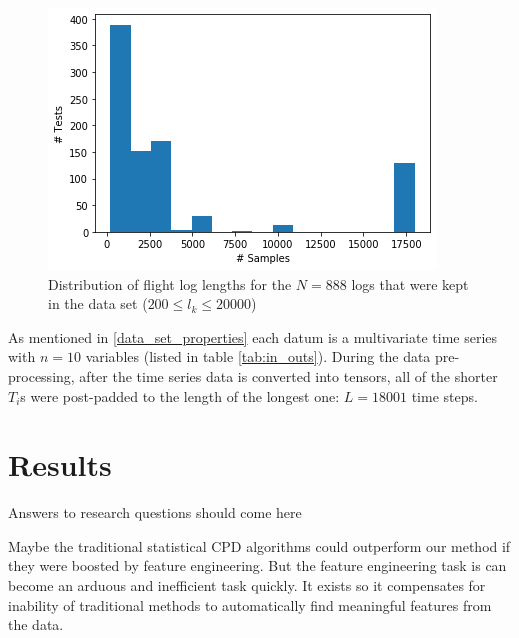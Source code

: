 \begin{figure}[h]
    \centering
    \includegraphics[width=\columnwidth]{Sections/test_lengths.png}
    \caption{Distribution of flight log lengths for the $N=888$ logs that were kept in the data set ($200 \leq l_k \leq 20000$)}
    \label{fig:test_lengths}
\end{figure}

As mentioned in \ref{data_set_properties} each datum is a multivariate time series with $n=10$ variables (listed in table \ref{tab:in_outs}). 
During the data pre-processing, after the time series data is converted into tensors, all of the shorter $T_i$s were post-padded to the length of the longest one: $L=18001$ time steps. 

\section{Results}
Answers to research questions should come here


Maybe the traditional statistical CPD algorithms could outperform our method if they were boosted by feature engineering. But the feature engineering task is can become an arduous and inefficient task quickly. It exists so it compensates for inability of traditional methods to automatically find meaningful features from the data. \cite{bengio2013deep}



